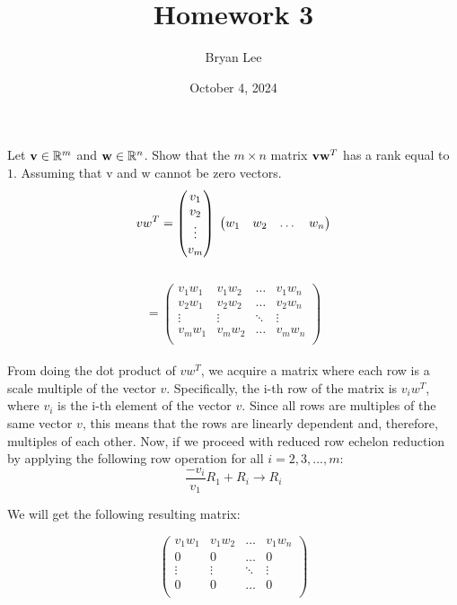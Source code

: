 \documentclass{article}
\title{Homework 3}
\author{Bryan Lee}
\date{October 4, 2024}
\begin{document}
\maketitle

 Let ${\bf v} \in \mathbb{R}^m$ and ${\bf w} \in \mathbb{R}^n$. Show that
the $m \times n$ matrix ${\bf v} {\bf w}^T$ has a rank equal to $1$. Assuming that v and w cannot be zero vectors.\\

\[
vw^T = 
\begin{pmatrix}
v_1\\
v_2\\
\vdots\\
v_m
\end{pmatrix}
\hspace{0.1cm}
\begin{pmatrix}
w_1 & w_2 & \dots & w_n
\end{pmatrix}
\]\\
\[
=
\begin{pmatrix}
v_1w_1 & v_1w_2 & \dots & v_1w_n\\
v_2w_1 & v_2w_2 & \dots & v_2w_n\\
\vdots & \vdots & \ddots & \vdots\\
v_mw_1 & v_mw_2 & \dots & v_mw_n\\
\end{pmatrix}
\]\\
From doing the dot product of $vw^T$, we acquire a matrix where each row is a scale multiple of the vector $v$. Specifically, the i-th row of the matrix is $v_iw^T$, where  $v_i$ is the i-th element of the vector $v$. Since all rows are multiples of the same vector $v$, this means that the rows are linearly dependent and, therefore, multiples of each other. Now, if we proceed with reduced row echelon reduction by applying the following row operation for all $i = 2, 3, ..., m:$\\
\[
\frac{-v_i}{v_1}R_1 + R_i\rightarrow R_i
\]

\noindent{} We will get the following resulting matrix:

\[
\begin{pmatrix}
v_1w_1 & v_1w_2 & \dots & v_1w_n\\
0 & 0 & \dots & 0\\
\vdots & \vdots & \ddots & \vdots\\
0 & 0 & \dots & 0\\
\end{pmatrix}
\]\\
\end{document}
